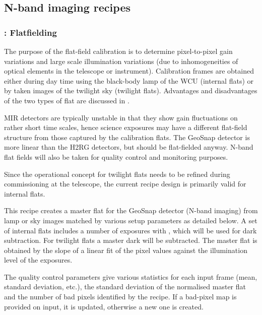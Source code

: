 
\subsection{N-band imaging recipes}
\label{ssec:recipes_img_n}
\subsubsection{:  Flatfielding}
\label{n_img_flatfield}
\label{rec:n_img_flatfield}
\label{sssec:n_img_flatfield}
\label{n_img_flat}
\label{rec:n_img_flat}
\label{sssec:n_img_flat}
\label{metis_n_img_flat}
\label{rec:metis_n_img_flat}
\label{sssec:metis_n_img_flat}

The purpose of the flat-field calibration is to determine
pixel-to-pixel gain variations and large scale illumination variations
(due to inhomogeneities of optical elements in the telescope or
instrument). Calibration frames are obtained either during day time
using the black-body lamp of the \ac{WCU} (internal flats) or by taken
images of the twilight sky (twilight flats). Advantages and
disadvantages of the two types of flat are discussed in
\cite{METIS-calibration_plan}.

MIR detectors are typically unstable in that they show gain
fluctuations on rather short time scales, hence science exposures may
have a different flat-field structure from those captured by the
calibration flats.  The GeoSnap detector is more linear
than the H2RG detectors, but should be flat-fielded anyway.
N-band flat fields will also be taken for quality control and monitoring purposes.

Since the operational concept for twilight flats needs to be refined
during commissioning at the telescope, the current recipe design is
primarily valid for internal flats.

This recipe creates a master flat for the GeoSnap detector (N-band
imaging) from lamp or sky images matched by various setup parameters
as detailed below.  A set of internal flats includes a number of
exposures with , which will be used for dark
subtraction. For twilight flats a master dark will be subtracted. The
master flat is obtained by the slope of a linear fit of the pixel
values against the illumination level of the exposures.

The quality control parameters give various statistics for each input
frame (mean, standard deviation, etc.), the standard deviation of the
normalised master flat and the number of bad pixels identified by the
recipe. If a bad-pixel map is provided on input, it is updated,
otherwise a new one is created.

